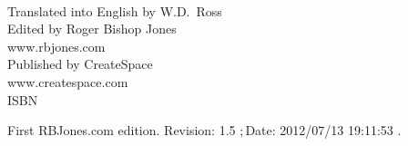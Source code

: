 \begin{titlepage}
\maketitle

\ 
\\

\vfill

\begin{centering}




\vfill

Translated into English by W.D.~Ross\\
\vspace{0.1in}
Edited by Roger Bishop Jones\\
\vspace{0.05in}
www.rbjones.com\\
\vspace{0.1in}
Published by CreateSpace\\
\vspace{0.05in}
www.createspace.com\\
\vspace{0.2in}
ISBN\\

\vspace{0.2in}

{\footnotesize



First RBJones.com edition. $ $Revision: 1.5 $; $Date: 2012/07/13 19:11:53 $ $.


}%

\end{centering}


\thispagestyle{empty}
\end{titlepage}

{\parskip=0pt\tableofcontents}


